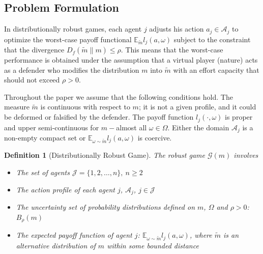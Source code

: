 \documentclass{article}
\newtheorem{defi}{Definition}
\begin{document}
\subsection{Problem Formulation}
In distributionally robust games, each agent $j$ adjusts his action $a_j\in \mathcal{A}_j$ to optimize the worst-case payoff functional $\mathbb{E}_{\tilde{m}} l_j(a,\omega)$ subject to the constraint that the divergence $D_f(\tilde{m}\parallel m )\leq \rho$. This means that the worst-case performance is obtained under the assumption that a virtual player (nature) acts as a defender who modifies the distribution $m$ into $\tilde{m}$ with an effort capacity that should not exceed $\rho>0$.

Throughout the paper we assume that the following conditions hold. The measure $\tilde{m}$ is continuous with respect to $m$; it is not a given profile, and it could be deformed or falsified by the defender. The payoff function $l_j(\cdot,\omega)$ is proper and upper semi-continuous for $m-$almost all $\omega\in\Omega$. Either the domain $\mathcal{A}_j$ is a non-empty compact set or $\mathbb{E}_{\omega \sim \tilde{m}} l_j(a,\omega)$ is coercive.

\begin{defi}[Distributionally Robust Game]
The robust game $\mathcal{G}(m)$ involves
\begin{itemize}
\item The set of agents $\mathcal{J}=\{1,2,\ldots, n\}, \ n\geq 2$
\item The action profile of each agent $j$, $\mathcal{A}_j$, $j\in \mathcal{J}$
\item The uncertainty set of probability distributions defined on $m$, $\Omega$ and $\rho>0$: $B_{\rho}(m)$
\item The expected payoff function of agent $j$: $\mathbb{E}_{\omega \sim \tilde{m}} l_j(a,\omega)$, where $\tilde{m}$ is an alternative distribution of $m$ within some bounded distance
\end{itemize}
\end{defi}
\end{document}
